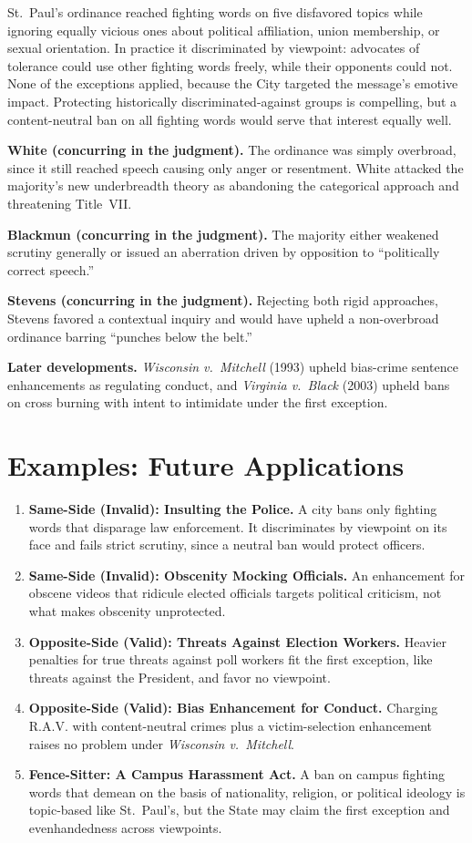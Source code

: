 \documentclass[12pt]{article}
\begin{document}
St.~Paul's ordinance reached fighting words on five disfavored topics while ignoring equally vicious ones about political affiliation, union membership, or sexual orientation. In practice it discriminated by viewpoint: advocates of tolerance could use other fighting words freely, while their opponents could not. None of the exceptions applied, because the City targeted the message's emotive impact. Protecting historically discriminated-against groups is compelling, but a content-neutral ban on all fighting words would serve that interest equally well.

\textbf{White (concurring in the judgment).} The ordinance was simply overbroad, since it still reached speech causing only anger or resentment. White attacked the majority's new underbreadth theory as abandoning the categorical approach and threatening Title~VII.

\textbf{Blackmun (concurring in the judgment).} The majority either weakened scrutiny generally or issued an aberration driven by opposition to ``politically correct speech.''

\textbf{Stevens (concurring in the judgment).} Rejecting both rigid approaches, Stevens favored a contextual inquiry and would have upheld a non-overbroad ordinance barring ``punches below the belt.''

\textbf{Later developments.} \textit{Wisconsin v.\ Mitchell} (1993) upheld bias-crime sentence enhancements as regulating conduct, and \textit{Virginia v.\ Black} (2003) upheld bans on cross burning with intent to intimidate under the first exception.

\section{Examples: Future Applications}

\begin{enumerate}
\item \textbf{Same-Side (Invalid): Insulting the Police.} A city bans only fighting words that disparage law enforcement. It discriminates by viewpoint on its face and fails strict scrutiny, since a neutral ban would protect officers.
\item \textbf{Same-Side (Invalid): Obscenity Mocking Officials.} An enhancement for obscene videos that ridicule elected officials targets political criticism, not what makes obscenity unprotected.
\item \textbf{Opposite-Side (Valid): Threats Against Election Workers.} Heavier penalties for true threats against poll workers fit the first exception, like threats against the President, and favor no viewpoint.
\item \textbf{Opposite-Side (Valid): Bias Enhancement for Conduct.} Charging R.A.V. with content-neutral crimes plus a victim-selection enhancement raises no problem under \textit{Wisconsin v.\ Mitchell}.
\item \textbf{Fence-Sitter: A Campus Harassment Act.} A ban on campus fighting words that demean on the basis of nationality, religion, or political ideology is topic-based like St.~Paul's, but the State may claim the first exception and evenhandedness across viewpoints.
\end{enumerate}
\end{document}
